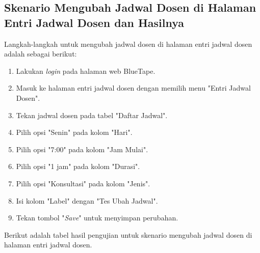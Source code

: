 \subsection{Skenario Mengubah Jadwal Dosen di Halaman Entri Jadwal Dosen dan Hasilnya}
\label{subsec:skenario_mengubah_jadwal_dosen_di_halaman_entri_jadwal_dosen}
Langkah-langkah untuk mengubah jadwal dosen di halaman entri jadwal dosen adalah sebagai berikut:

\begin{enumerate}
    \item Lakukan \textit{login} pada halaman web BlueTape.
    \item Masuk ke halaman entri jadwal dosen dengan memilih menu "Entri Jadwal Dosen".
    \item Tekan jadwal dosen pada tabel "Daftar Jadwal".
    \item Pilih opsi "Senin" pada kolom "Hari".
    \item Pilih opsi "7:00" pada kolom "Jam Mulai".
    \item Pilih opsi "1 jam" pada kolom "Durasi".
    \item Pilih opsi "Konsultasi" pada kolom "Jenis".
    \item Isi kolom "Label" dengan "Tes Ubah Jadwal".
    \item Tekan tombol "\textit{Save}" untuk menyimpan perubahan.
\end{enumerate}

Berikut adalah tabel hasil pengujian untuk skenario mengubah jadwal dosen di halaman entri jadwal dosen.

